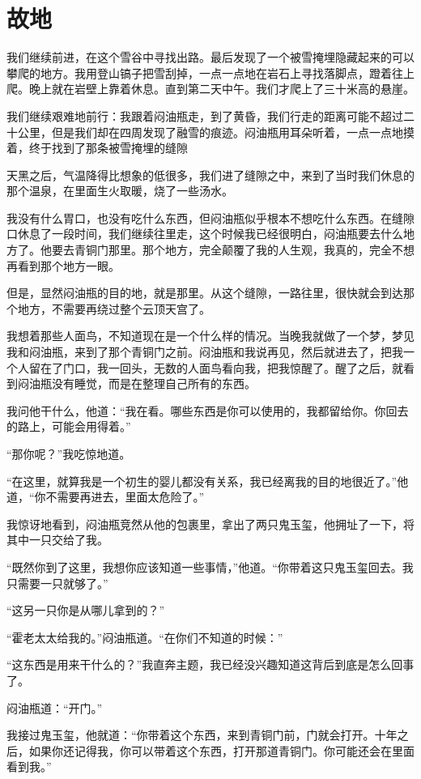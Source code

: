 \chapter{故地}

我们继续前进，在这个雪谷中寻找出路。最后发现了一个被雪掩埋隐藏起来的可以攀爬的地方。我用登山镐子把雪刮掉，一点一点地在岩石上寻找落脚点，蹬着往上爬。晚上就在岩壁上靠着休息。直到第二天中午。我们才爬上了三十米高的悬崖。

我们继续艰难地前行：我跟着闷油瓶走，到了黄昏，我们行走的距离可能不超过二十公里，但是我们却在四周发现了融雪的痕迹。闷油瓶用耳朵听着，一点一点地摸着，终于找到了那条被雪掩埋的缝隙

天黑之后，气温降得比想象的低很多，我们进了缝隙之中，来到了当时我们休息的那个温泉，在里面生火取暖，烧了一些汤水。

我没有什么胃口，也没有吃什么东西，但闷油瓶似乎根本不想吃什么东西。在缝隙口休息了一段时间，我们继续往里走，这个时候我已经很明白，闷油瓶要去什么地方了。他要去青铜门那里。那个地方，完全颠覆了我的人生观，我真的，完全不想再看到那个地方一眼。

但是，显然闷油瓶的目的地，就是那里。从这个缝隙，一路往里，很快就会到达那个地方，不需要再绕过整个云顶天宫了。

我想着那些人面鸟，不知道现在是一个什么样的情况。当晚我就做了一个梦，梦见我和闷油瓶，来到了那个青铜门之前。闷油瓶和我说再见，然后就进去了，把我一个人留在了门口，我一回头，无数的人面鸟看向我，把我惊醒了。醒了之后，就看到闷油瓶没有睡觉，而是在整理自己所有的东西。

我问他干什么，他道：“我在看。哪些东西是你可以使用的，我都留给你。你回去的路上，可能会用得着。”

“那你呢？”我吃惊地道。

“在这里，就算我是一个初生的婴儿都没有关系，我已经离我的目的地很近了。”他道，“你不需要再进去，里面太危险了。”

我惊讶地看到，闷油瓶竞然从他的包裹里，拿出了两只鬼玉玺，他拥址了一下，将其中一只交给了我。

“既然你到了这里，我想你应该知道一些事情，”他道。“你带着这只鬼玉玺回去。我只需要一只就够了。”

“这另一只你是从哪儿拿到的？”

“霍老太太给我的。”闷油瓶道。“在你们不知道的时候：”

“这东西是用来干什么的？”我直奔主题，我已经没兴趣知道这背后到底是怎么回事了。

闷油瓶道：“开门。”

我接过鬼玉玺，他就道：“你带着这个东西，来到青铜门前，门就会打开。十年之后，如果你还记得我，你可以带着这个东西，打开那道青铜门。你可能还会在里面看到我。”


